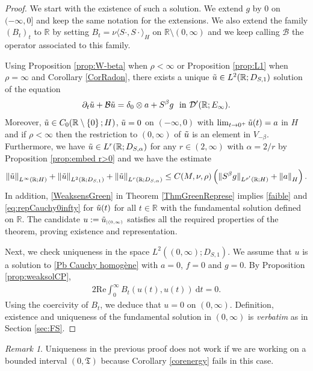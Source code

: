 \documentclass[11pt, letterpaper]{amsart}
\theoremstyle{definition}
\theoremstyle{remark}
\newtheorem{rem}[thm]{Remark}
\numberwithin{equation}{section}
\begin{document}
\begin{proof}
We start with the existence of such a solution. We extend  $g$ by $0$ on $(-\infty,0]$ and keep the same notation for the extensions. We also extend the family $({B}_t)_t$ to $\mathbb{R}$ by setting ${B}_t=\nu\langle S\cdot, S\cdot \rangle_H$ on $\mathbb{R}\setminus(0,\infty)$ and we keep calling ${\mathcal{B}}$ the operator associated to this family.

Using Proposition \ref{prop:W-beta} when $\rho<\infty$ or Proposition \ref{prop:L1} when $\rho=\infty$ and Corollary \ref{CorRadon}, there exists a unique $ \Tilde{u} \in L^2(\mathbb{R};D_{S,1})$ solution of the equation
\begin{equation*}
    \partial_t \Tilde{u} + \mathcal{B}\Tilde{u} = \delta_0 \otimes a + S^\beta g \ \ \mathrm{in} \ \mathcal{D}'(\mathbb{R};E_\infty).
\end{equation*}
Moreover, $\Tilde{u} \in C_0(\mathbb{R}\setminus\left \{ 0 \right \};H)$, $\Tilde{u}=0$ on $(-\infty,0)$ with $\lim_{t \to 0^+}\Tilde{u}(t)=a$ in $H$ and  if $\rho <\infty$ then the restriction to $(0,\infty)$ of $\Tilde{u}$ is an element in $V_{-\beta}$. Furthermore, we have $\Tilde{u} \in L^r(\mathbb{R};D_{S,\alpha})$ for any $r \in (2,\infty)$ with $\alpha={2}/{r}$ by Proposition \ref{prop:embed r>0} and we have the  estimate
$$ \left \| \Tilde{u} \right \|_{L^\infty(\mathbb{R};H)}+\left \| \Tilde{u} \right \|_{L^2(\mathbb{R};D_{S,1})}+\left \| \Tilde{u} \right \|_{L^r(\mathbb{R};D_{S,\alpha})} \leq C(M,\nu,\rho) \left ( 
\| S^\beta g  \|_{L^{\rho'}(\mathbb{R};H)}+ \left \| a \right \|_H \right ).$$
In addition,  \eqref{WeaksensGreen} in Theorem \ref{ThmGreenReprese} implies \eqref{faible} and \eqref{eq:repCauchy0infty} for $\Tilde{u}(t)$ for all $t\in \mathbb{R}$ with the fundamental solution defined on $\mathbb{R}$.
The candidate $u:= \Tilde{u}_{\scriptscriptstyle{\vert (0,\infty)}}$ satisfies all the required properties of the theorem, proving existence and representation.  

Next, we check uniqueness in the space $L^2((0,\infty);D_{S,1})$. We assume that $u$ is a solution to \eqref{Pb Cauchy homogène} with $a=0$, $f=0$ and $g=0$. By 
Proposition \ref{prop:weaksolCP},
\begin{align*}
          2\mathrm{Re}\int_{0}^{\infty} B_t(u(t),u(t)) \  \mathrm d t = 0.
\end{align*}
Using the coercivity of $B_t$,  we deduce that $u=0$ on $(0,\infty)$. Definition, existence and uniqueness of the fundamental solution in $(0,\infty)$ is \textit{verbatim} as in Section \ref{sec:FS}. 
\end{proof}
\begin{rem}\label{Cauchy Pb homo}
    Uniqueness in the previous proof does not work if we are working on a bounded interval $(0,\mathfrak{T})$ because Corollary \ref{corenergy} fails in this case.
\end{rem}
\end{document}
